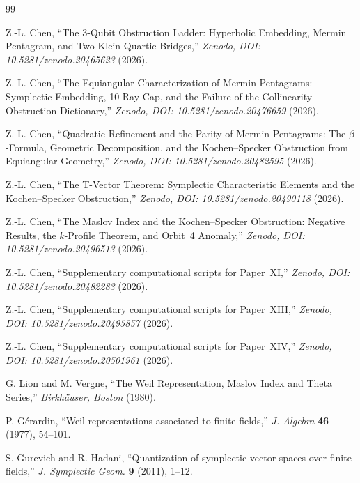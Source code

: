 \documentclass[11pt,a4paper]{article}
\theoremstyle{remark}
\begin{document}
\begin{thebibliography}{99}

Z.-L. Chen,
``The 3-Qubit Obstruction Ladder: Hyperbolic Embedding,
Mermin Pentagram, and Two Klein Quartic Bridges,''
\textit{Zenodo, DOI: 10.5281/zenodo.20465623} (2026).

Z.-L. Chen,
``The Equiangular Characterization of Mermin Pentagrams:
Symplectic Embedding, 10-Ray Cap, and the Failure of the
Collinearity--Obstruction Dictionary,''
\textit{Zenodo, DOI: 10.5281/zenodo.20476659} (2026).

Z.-L. Chen,
``Quadratic Refinement and the Parity of Mermin Pentagrams:
The $\beta$-Formula, Geometric Decomposition, and the
Kochen--Specker Obstruction from Equiangular Geometry,''
\textit{Zenodo, DOI: 10.5281/zenodo.20482595} (2026).

Z.-L. Chen,
``The T-Vector Theorem: Symplectic Characteristic Elements
and the Kochen--Specker Obstruction,''
\textit{Zenodo, DOI: 10.5281/zenodo.20490118} (2026).

Z.-L. Chen,
``The Maslov Index and the Kochen--Specker Obstruction:
Negative Results, the $k$-Profile Theorem, and Orbit~4 Anomaly,''
\textit{Zenodo, DOI: 10.5281/zenodo.20496513} (2026).

Z.-L. Chen,
``Supplementary computational scripts for Paper~XI,''
\textit{Zenodo, DOI: 10.5281/zenodo.20482283} (2026).

Z.-L. Chen,
``Supplementary computational scripts for Paper~XIII,''
\textit{Zenodo, DOI: 10.5281/zenodo.20495857} (2026).

Z.-L. Chen,
``Supplementary computational scripts for Paper~XIV,''
\textit{Zenodo, DOI: 10.5281/zenodo.20501961} (2026).

G. Lion and M. Vergne,
``The Weil Representation, Maslov Index and Theta Series,''
\textit{Birkh\"auser, Boston} (1980).

P. G\'erardin,
``Weil representations associated to finite fields,''
\textit{J. Algebra} \textbf{46} (1977), 54--101.

S. Gurevich and R. Hadani,
``Quantization of symplectic vector spaces over finite fields,''
\textit{J. Symplectic Geom.} \textbf{9} (2011), 1--12.

\end{thebibliography}
\end{document}

